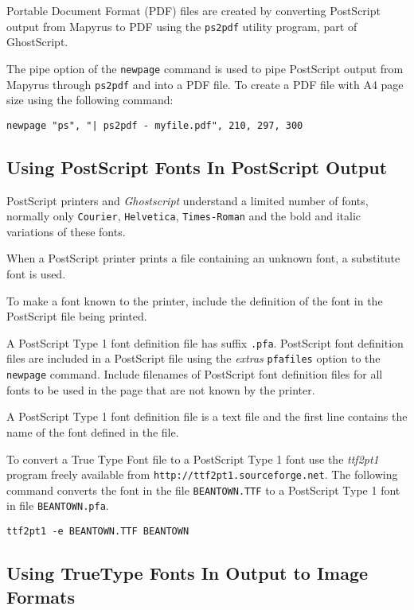 Portable Document Format (PDF) files are created by converting PostScript
output from Mapyrus to PDF using the \texttt{ps2pdf} utility program, part of
GhostScript.

The pipe option of the \texttt{newpage} command is used to pipe PostScript
output from Mapyrus through \texttt{ps2pdf} and into a PDF file.  To create
a PDF file with A4 page size using the following command:

\begin{verbatim}
newpage "ps", "| ps2pdf - myfile.pdf", 210, 297, 300
\end{verbatim}

\subsection{Using PostScript Fonts In PostScript Output}
\label{psfonts}

PostScript printers and \textit{Ghostscript}
understand a limited number of fonts,
normally only \texttt{Courier},
\texttt{Helvetica}, \texttt{Times-Roman} and the bold
and italic variations of these fonts.

When a PostScript printer prints a file containing an unknown font,
a substitute font is used.

To make a font known to the printer, include the definition of
the font in the PostScript file being printed.

A PostScript Type 1 font definition file has suffix \texttt{.pfa}.  PostScript
font definition files are included in a PostScript file using the
\textit{extras} \texttt{pfafiles} option to the \texttt{newpage} command.
Include filenames of PostScript font definition files for all fonts to be used
in the page that are not known by the printer.

A PostScript Type 1 font definition file is a text file and
the first line contains the name of the font defined in the file.

To convert a True Type Font file to a PostScript Type 1 font use the
\textit{ttf2pt1} program freely available from
\texttt{http://ttf2pt1.sourceforge.net}.  The following command converts the
font in the file \texttt{BEANTOWN.TTF} to a PostScript Type 1 font in file
\texttt{BEANTOWN.pfa}.

\begin{verbatim}
ttf2pt1 -e BEANTOWN.TTF BEANTOWN
\end{verbatim}

\subsection{Using TrueType Fonts In Output to Image Formats}
\label{ttffonts}

